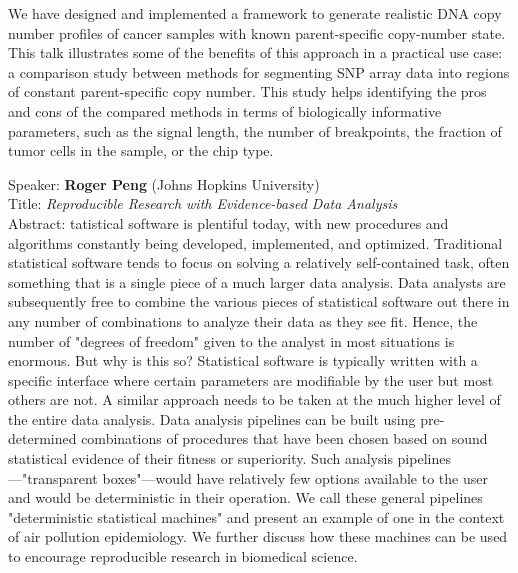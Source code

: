 \documentclass[11pt]{article}
\begin{document}
\noindent We have designed and implemented a framework to generate realistic DNA
copy number profiles of cancer samples with known parent-specific
copy-number state.  This talk illustrates some of the benefits of this
approach in a practical use case: a comparison study between methods
for segmenting SNP array data into regions of constant parent-specific
copy number.   This study helps identifying the pros and cons of the
compared methods in terms of biologically informative parameters, such
as the signal length, the number of breakpoints, the fraction of tumor
cells in the sample, or the chip type.

\bigskip
\noindent
Speaker: {\bf Roger Peng} (Johns Hopkins University)\\
Title: {\it Reproducible Research with Evidence-based Data Analysis}\\
Abstract: tatistical software is plentiful today, with new procedures and
algorithms constantly being developed, implemented, and optimized.
Traditional statistical software tends to focus on solving a
relatively self-contained task, often something that is a single piece
of a much larger data analysis. Data analysts are subsequently free to
combine the various pieces of statistical software out there in any
number of combinations to analyze their data as they see fit. Hence,
the number of "degrees of freedom" given to the analyst in most
situations is enormous. But why is this so? Statistical software is
typically written with a specific interface where certain parameters
are modifiable by the user but most others are not. A similar approach
needs to be taken at the much higher level of the entire data
analysis. Data analysis pipelines can be built using pre-determined
combinations of procedures that have been chosen based on sound
statistical evidence of their fitness or superiority.  Such analysis
pipelines---"transparent boxes"---would have relatively few options
available to the user and would be deterministic in their operation.
We call these general pipelines "deterministic statistical machines"
and present an example of one in the context of air pollution
epidemiology. We further discuss how these machines can be used to
encourage reproducible research in biomedical science.
\end{document}
